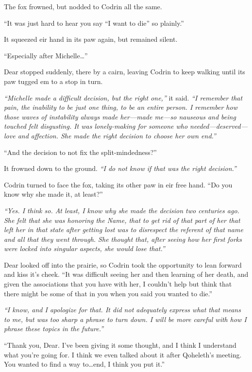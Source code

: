 The fox frowned, but nodded to Codrin all the same.

``It was just hard to hear you say ``I want to die'' so plainly.''

It squeezed eir hand in its paw again, but remained silent.

``Especially after Michelle\ldots{}''

Dear stopped suddenly, there by a cairn, leaving Codrin to keep walking until its paw tugged em to a stop in turn.

\emph{``Michelle made a difficult decision, but the right one,''} it said. \emph{``I remember that pain, the inability to be just one thing, to be an entire person. I remember how those waves of instability always made her---made me---so nauseous and being touched felt disgusting. It was lonely-making for someone who needed---deserved---love and affection. She made the right decision to choose her own end.''}

``And the decision to not fix the split-mindedness?''

It frowned down to the ground. \emph{``I do not know if that was the right decision.''}

Codrin turned to face the fox, taking its other paw in eir free hand. ``Do you know why she made it, at least?''

\emph{``Yes. I think so. At least, I know why she made the decision two centuries ago. She felt that she was honoring the Name, that to get rid of that part of her that left her in that state after getting lost was to disrespect the referent of that name and all that they went through. She thought that, after seeing how her first forks were locked into singular aspects, she would lose that.''}

Dear looked off into the prairie, so Codrin took the opportunity to lean forward and kiss it's cheek. ``It was difficult seeing her and then learning of her death, and given the associations that you have with her, I couldn't help but think that there might be some of that in you when you said you wanted to die.''

\emph{``I know, and I apologize for that. It did not adequately express what that means to me, but was too sharp a phrase to turn down. I will be more careful with how I phrase these topics in the future.''}

``Thank you, Dear. I've been giving it some thought, and I think I understand what you're going for. I think we even talked about it after Qoheleth's meeting. You wanted to find a way to\ldots end, I think you put it.''

